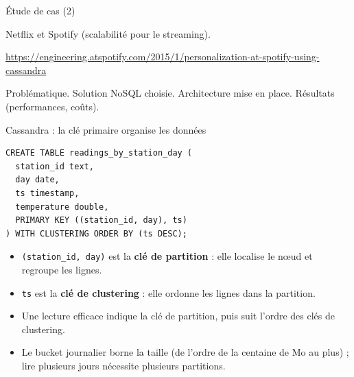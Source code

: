 \begin{frame}{Étude de cas (2)}

    Netflix et Spotify (scalabilité pour le streaming).

    \url{https://engineering.atspotify.com/2015/1/personalization-at-spotify-using-cassandra}

    Problématique. Solution NoSQL choisie. Architecture mise en place. Résultats
    (performances, coûts).


\end{frame}

\begin{frame}[fragile]{Cassandra : la clé primaire organise les données}
    \begin{verbatim}
CREATE TABLE readings_by_station_day (
  station_id text,
  day date,
  ts timestamp,
  temperature double,
  PRIMARY KEY ((station_id, day), ts)
) WITH CLUSTERING ORDER BY (ts DESC);
\end{verbatim}
    \begin{itemize}
        \item \texttt{(station\_id, day)} est la \textbf{clé de partition} :
              elle localise le nœud et regroupe les lignes.
        \item \texttt{ts} est la \textbf{clé de clustering} : elle ordonne les
              lignes dans la partition.
        \item Une lecture efficace indique la clé de partition, puis suit
              l'ordre des clés de clustering.
        \item Le bucket journalier borne la taille (de l'ordre de la centaine de
              Mo au plus) ; lire plusieurs jours nécessite plusieurs partitions.
    \end{itemize}
\end{frame}

